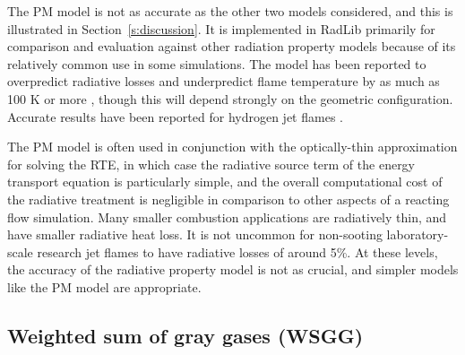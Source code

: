 \documentclass[preprint,12pt]{elsarticle}
\begin{document}
    The PM model is not as accurate as the other two models considered, and this is illustrated in Section~\ref{s:discussion}.
    It is implemented in RadLib primarily for comparison and evaluation against other radiation property models because of its relatively common use in some simulations.
    The model has been reported to overpredict radiative losses and underpredict flame temperature by as much as 100 K or more \cite{Frank_2000,Zhu_2002,Coelho_2002}, though this will depend strongly on the geometric configuration. Accurate results have been reported for hydrogen jet flames \cite{Barlow_1999}.

    The PM model is often used in conjunction with the optically-thin approximation for solving the RTE, in which case the radiative source term of the energy transport equation is particularly simple, and the overall computational cost of the radiative treatment is negligible in comparison to other aspects of a reacting flow simulation. Many smaller combustion applications are radiatively thin, and have smaller radiative heat loss. It is not uncommon for non-sooting laboratory-scale research jet flames to have radiative losses of around 5\%. At these levels, the accuracy of the radiative property model is not as crucial, and simpler models like the PM model are appropriate.


    \subsection{Weighted sum of gray gases (WSGG)} \label{s:wsgg}
\end{document}
